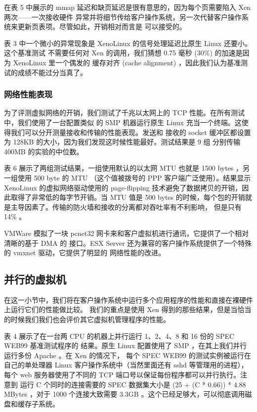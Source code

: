 在表 5 中展示的 mmap 延迟和缺页延迟是很有意思的，因为每个页需要陷入 Xen 两次——一次接收硬件
异常并将细节传给客户操作系统，另一次代替客户操作系统来更新页表项。尽管如此，开销相对而言是
可以接受的。

表 3 中一个微小的异常现象是 XenoLinux 的信号处理延迟比原生 Linux 还要小。这个基准测试
不需要任何对 Xen 的调用，我们猜想 0.75 毫秒 (30\%) 的加速是因为 XenoLinux 里一个偶发的
缓存对齐 (cache alignment) ，因此我们认为基准测试的成绩不能过分当真了。

\subsubsection{网络性能表现}

为了评测虚拟网络的开销，我们测试了千兆以太网上的 TCP 性能。在所有测试中，我们使用了一台配置类似
的 SMP 机器运行原生 Linux 充当一个终端。这使得我们可以分开测量接收和传输的性能表现。发送和
接收的 socket 缓冲区都设置为 128KB 的大小，因为我们发现这时候性能最好。测试结果是 9 组
分别传输 400MB 的实验的中位数。

表 6 展示了两组测试结果，一组使用默认的以太网 MTU 也就是 1500 bytes ，另一组使用 500 byte
的 MTU （这个值被拨号的 PPP 客户端广泛使用）。结果显示 XenoLinux 的虚拟网络驱动使用的
page-flipping 技术避免了数据拷贝的开销，因此取得了非常低的每字节开销。当 MTU 值是
500 bytes 的时候，每个包的开销就是主导因素了。传输的防火墙和接收的分离都对吞吐率有不利影响，
但是只有 14\% 。

VMWare 模拟了一块 pcnet32 网卡来和客户虚拟机进行通讯，它提供了一个相对清晰的基于 DMA 的
接口。ESX Server 还为兼容的客户操作系统提供了一个特殊的 vmxnet 驱动，它提供了明显的
网络性能的改进。

\subsection{并行的虚拟机}

在这一小节中，我们将在客户操作系统中运行多个应用程序的性能和直接在裸硬件上运行它们的性能做比较。
我们的重点是使用 Xen 得到的那些结果，但是当恰当的时候我们我们也会评价其它虚拟机管理程序的性能。

表 4 展示了在一台两 CPU 的机器上并行运行 1、2、4、8 和 16 份的 SPEC WEB99 基准测试程序的
结果。原生 Linux 配置使用了 SMP ，在其上我们并行运行多份 Apache 。在 Xen 的情况下，
每个 SPEC WEB99 的测试实例被运行在自己的单处理器 Linux 客户操作系统中（当然里面还有 sshd
等管理用的进程），每个 web 服务器使用了不同的 TCP 端口号以保证每份程序都可以并行执行。注意到
运行 C 个同时的连接需要的 SPEC 数据集大小是 (25 + (C * 0.66)) * 4.88 MBytes ，对于
1000 个连接大致需要 3.3GB 。这个已经足够大，可以彻底调用磁盘和缓存子系统。

